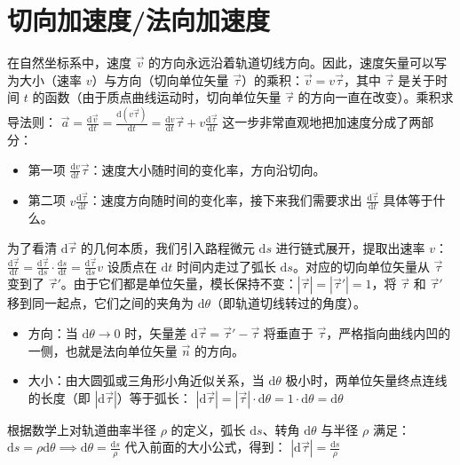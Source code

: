 
\section{切向加速度/法向加速度}

在自然坐标系中，速度 $\vec{v}$ 的方向永远沿着轨道切线方向。因此，速度矢量可以写为大小（速率 $v$）与方向（切向单位矢量 $\vec{\tau}$）的乘积：$\vec{v} = v\vec{\tau}$，其中 $\vec{\tau}$ 是关于时间 $t$ 的函数（由于质点曲线运动时，切向单位矢量 $\vec{\tau}$ 的方向一直在改变）。乘积求导法则： \(\vec{a} = \frac{\mathrm{d}\vec{v}}{\mathrm{d}t} = \frac{\mathrm{d}(v\vec{\tau})}{\mathrm{d}t} = \frac{\mathrm{d}v}{\mathrm{d}t}\vec{\tau} + v\frac{\mathrm{d}\vec{\tau}}{\mathrm{d}t}\) 
这一步非常直观地把加速度分成了两部分：
\begin{itemize}
\item 第一项 $\frac{\mathrm{d}v}{\mathrm{d}t}\vec{\tau}$：速度大小随时间的变化率，方向沿切向。
\item 第二项 $v\frac{\mathrm{d}\vec{\tau}}{\mathrm{d}t}$：速度方向随时间的变化率，接下来我们需要求出 $\frac{\mathrm{d}\vec{\tau}}{\mathrm{d}t}$ 具体等于什么。
\end{itemize}
为了看清 $\mathrm{d}\vec{\tau}$ 的几何本质，我们引入路程微元 $\mathrm{d}s$ 进行链式展开，提取出速率 $v$：
 \(\frac{\mathrm{d}\vec{\tau}}{\mathrm{d}t} = \frac{\mathrm{d}\vec{\tau}}{\mathrm{d}s} \cdot \frac{\mathrm{d}s}{\mathrm{d}t} = \frac{\mathrm{d}\vec{\tau}}{\mathrm{d}s} v\) 
设质点在 $\mathrm{d}t$ 时间内走过了弧长 $\mathrm{d}s$。对应的切向单位矢量从 $\vec{\tau}$ 变到了 $\vec{\tau}'$。由于它们都是单位矢量，模长保持不变：$|\vec{\tau}| = |\vec{\tau}'| = 1$，将 $\vec{\tau}$ 和 $\vec{\tau}'$ 移到同一起点，它们之间的夹角为 $\mathrm{d}\theta$（即轨道切线转过的角度）。
\begin{itemize}
\item 方向：当 $\mathrm{d}\theta \to 0$ 时，矢量差 $\mathrm{d}\vec{\tau} = \vec{\tau}' - \vec{\tau}$ 将垂直于 $\vec{\tau}$，严格指向曲线内凹的一侧，也就是法向单位矢量 $\vec{n}$ 的方向。
\item 大小：由大圆弧或三角形小角近似关系，当 $\mathrm{d}\theta$ 极小时，两单位矢量终点连线的长度（即 $|\mathrm{d}\vec{\tau}|$）等于弧长： \(|\mathrm{d}\vec{\tau}| = |\vec{\tau}| \cdot \mathrm{d}\theta = 1 \cdot \mathrm{d}\theta = \mathrm{d}\theta\) 
\end{itemize}
根据数学上对轨道曲率半径 $\rho$ 的定义，弧长 $\mathrm{d}s$、转角 $\mathrm{d}\theta$ 与半径 $\rho$ 满足：
 \(\mathrm{d}s = \rho \mathrm{d}\theta \implies \mathrm{d}\theta = \frac{\mathrm{d}s}{\rho}\) 
代入前面的大小公式，得到： \(|\mathrm{d}\vec{\tau}| = \frac{\mathrm{d}s}{\rho}\) 
